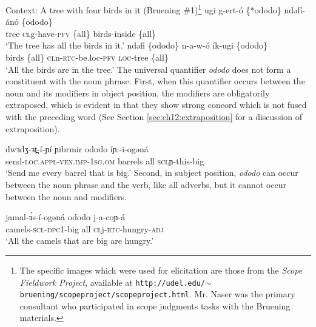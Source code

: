 \ea Context: A tree with four birds in it (Bruening \#1)\footnote{The specific images which were used for elicitation are those from the \textit{Scope 
Fieldwork Project}, available at \texttt{http://udel.edu/$\sim$bruening/scopeproject/scopeproject.html}. Mr. Naser was the primary consultant who participated in scope judgments tasks with the Bruening materials.} \label{allpost}
	\ea \gll ugi g-ert-ó \{*ododo\} ndəfí-ánó \{ododo\}\\
			tree \textsc{cl}g-have-\textsc{pfv} \{all\} birds-inside \{all\}\\
		\glt	‘The tree has all the birds in it.’
	\ex \gll ndəfi \{ododo\} n-a-w-ó ík-ugi \{ododo\}\\
			 birds \{all\} \textsc{cl}n-\textsc{rtc}-be.loc-\textsc{pfv} \textsc{loc}-tree \{all\}\\
		\glt	‘All the birds are in the tree.’  \hfill %
	\z
\z 
The universal quantifier \textit{ododo} does not form a constituent with the noun phrase. First, when this quantifier occurs between the noun and its modifiers in object position, the modifiers are obligatorily extraposed, which is evident in that they show strong concord which is not fused with the preceding word (See Section \ref{sec:ch12:extraposition} for a discussion of extraposition).

\ea \gll dwɜdʒ-ɜt̪-í-ɲí ɲibrmir ododo íɲ:-i-ogəná			\\
send-\textsc{loc}.\textsc{appl}-\textsc{ven.imp}-1\textsc{sg}.\textsc{om} barrels all \textsc{scl}ɲ-this-big\\ 
	\glt 	‘Send me every barrel that is big.’ 
\z  
Second, in subject position, \textit{ododo} can occur between the noun phrase and the verb, like all adverbs, but it cannot occur between the noun and modifiers.

\ea 
\ea 	\gll jamal-ɜ́s-í-ogəná ododo j-a-coɲ-á\\
camels-\textsc{scl}-\textsc{dpc1}-big all \textsc{cl}j-\textsc{rtc}-hungry-\textsc{adj}\\ 
			\glt 	‘All the camels that are big are hungry.’ 
		\z  
\z 


